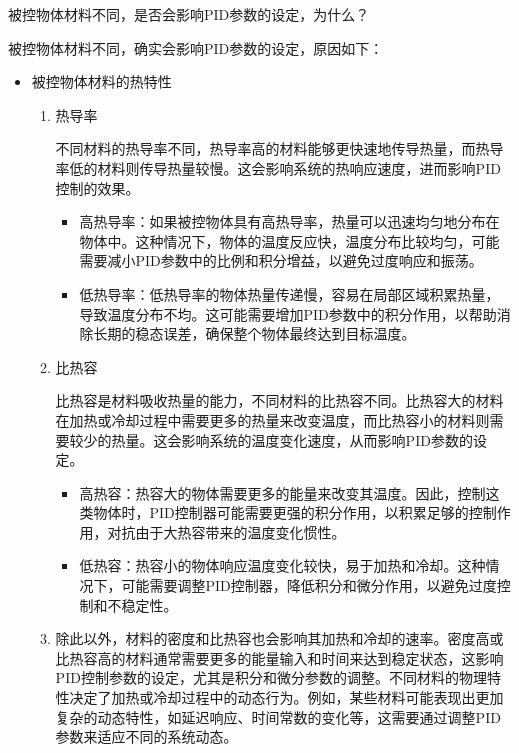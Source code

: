 \documentclass[dvipsnames, svgnames,a4paper,11pt]{article}
\begin{document}
	
	\begin{question}
		被控物体材料不同，是否会影响PID参数的设定，为什么？
	\end{question}
	
	被控物体材料不同，确实会影响PID参数的设定，原因如下：
	
	\begin{itemize}
		\item 被控物体材料的热特性
		\begin{enumerate}
			\item 热导率
			
			不同材料的热导率不同，热导率高的材料能够更快速地传导热量，而热导率低的材料则传导热量较慢。这会影响系统的热响应速度，进而影响PID控制的效果。
			
			\begin{itemize}
				\item 高热导率：如果被控物体具有高热导率，热量可以迅速均匀地分布在物体中。这种情况下，物体的温度反应快，温度分布比较均匀，可能需要减小PID参数中的比例和积分增益，以避免过度响应和振荡。
				\item 低热导率：低热导率的物体热量传递慢，容易在局部区域积累热量，导致温度分布不均。这可能需要增加PID参数中的积分作用，以帮助消除长期的稳态误差，确保整个物体最终达到目标温度。
			\end{itemize}
			
			\item 比热容
			
			比热容是材料吸收热量的能力，不同材料的比热容不同。比热容大的材料在加热或冷却过程中需要更多的热量来改变温度，而比热容小的材料则需要较少的热量。这会影响系统的温度变化速度，从而影响PID参数的设定。
			
			\begin{itemize}
				\item 高热容：热容大的物体需要更多的能量来改变其温度。因此，控制这类物体时，PID控制器可能需要更强的积分作用，以积累足够的控制作用，对抗由于大热容带来的温度变化惯性。
				\item 低热容：热容小的物体响应温度变化较快，易于加热和冷却。这种情况下，可能需要调整PID控制器，降低积分和微分作用，以避免过度控制和不稳定性。
			\end{itemize}
			
			\item 除此以外，材料的密度和比热容也会影响其加热和冷却的速率。密度高或比热容高的材料通常需要更多的能量输入和时间来达到稳定状态，这影响PID控制参数的设定，尤其是积分和微分参数的调整。不同材料的物理特性决定了加热或冷却过程中的动态行为。例如，某些材料可能表现出更加复杂的动态特性，如延迟响应、时间常数的变化等，这需要通过调整PID参数来适应不同的系统动态。
		\end{enumerate}
		

\end{itemize}
\end{document}
